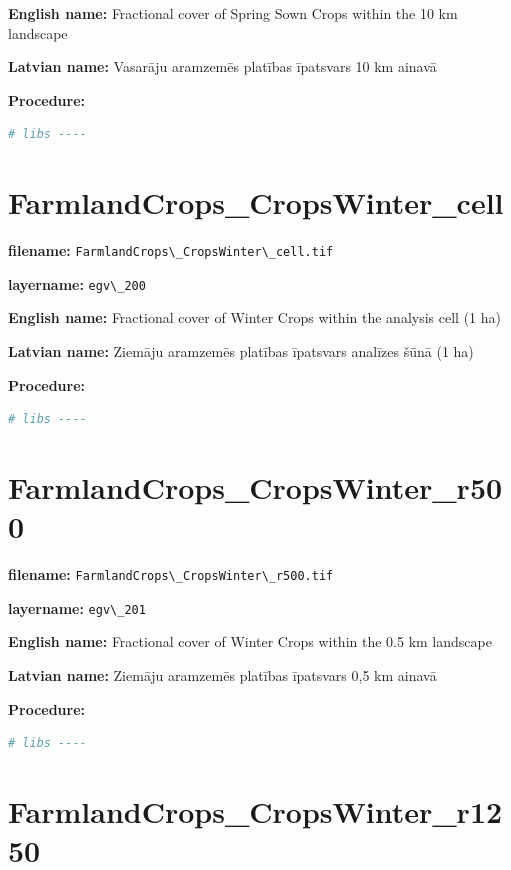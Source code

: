 \documentclass[
]{book}
\newcommand{\passthrough}[1]{#1}
\begin{document}
\textbf{English name:} Fractional cover of Spring Sown Crops within the 10 km landscape

\textbf{Latvian name:} Vasarāju aramzemēs platības īpatsvars 10 km ainavā

\textbf{Procedure:}

\begin{lstlisting}[language=R]
# libs ----
\end{lstlisting}

\section{FarmlandCrops\_CropsWinter\_cell}\label{ch06.200}

\textbf{filename:} \passthrough{\lstinline!FarmlandCrops\_CropsWinter\_cell.tif!}

\textbf{layername:} \passthrough{\lstinline!egv\_200!}

\textbf{English name:} Fractional cover of Winter Crops within the analysis cell (1 ha)

\textbf{Latvian name:} Ziemāju aramzemēs platības īpatsvars analīzes šūnā (1 ha)

\textbf{Procedure:}

\begin{lstlisting}[language=R]
# libs ----
\end{lstlisting}

\section{FarmlandCrops\_CropsWinter\_r500}\label{ch06.201}

\textbf{filename:} \passthrough{\lstinline!FarmlandCrops\_CropsWinter\_r500.tif!}

\textbf{layername:} \passthrough{\lstinline!egv\_201!}

\textbf{English name:} Fractional cover of Winter Crops within the 0.5 km landscape

\textbf{Latvian name:} Ziemāju aramzemēs platības īpatsvars 0,5 km ainavā

\textbf{Procedure:}

\begin{lstlisting}[language=R]
# libs ----
\end{lstlisting}

\section{FarmlandCrops\_CropsWinter\_r1250}\label{ch06.202}
\end{document}
